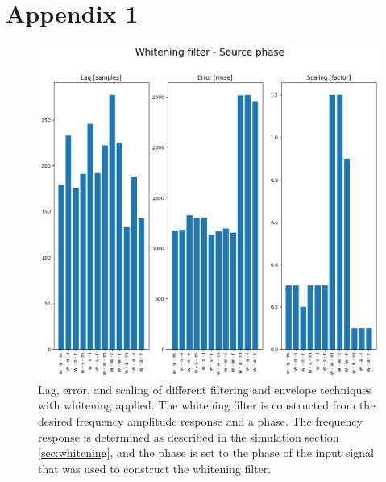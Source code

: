 \chapter{Appendix 1} \label{app:whitening}

\begin{figure}[h!t]
	\begin{center}
		\includegraphics[width=1.0\columnwidth]{images/result_whitening_sourcephase.png}
	\end{center}
	\caption{Lag, error, and scaling of different filtering and envelope techniques with whitening applied. The whitening filter is constructed from the desired frequency amplitude response and a phase. The frequency response is determined as described in the simulation section \ref{sec:whitening}, and the phase is set to the phase of the input signal that was used to construct the whitening filter.}
	\label{fig:result_whitening_sourcephase}
\end{figure}

